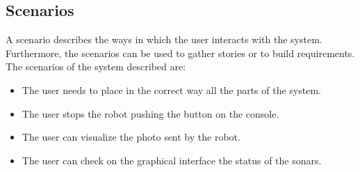 \subsection{Scenarios}
A scenario describes the ways in which the user interacts with the system. Furthermore, the scenarios can be used to gather stories or to build requirements.
The scenarios of the system described are:
\begin{itemize}
\item The user needs to place in the correct way all the parts of the system.
\item The user stops the robot pushing the button on the console.
\item The user can visualize the photo sent by the robot.
\item The user can check on the graphical interface the status of the sonars.
\end{itemize}